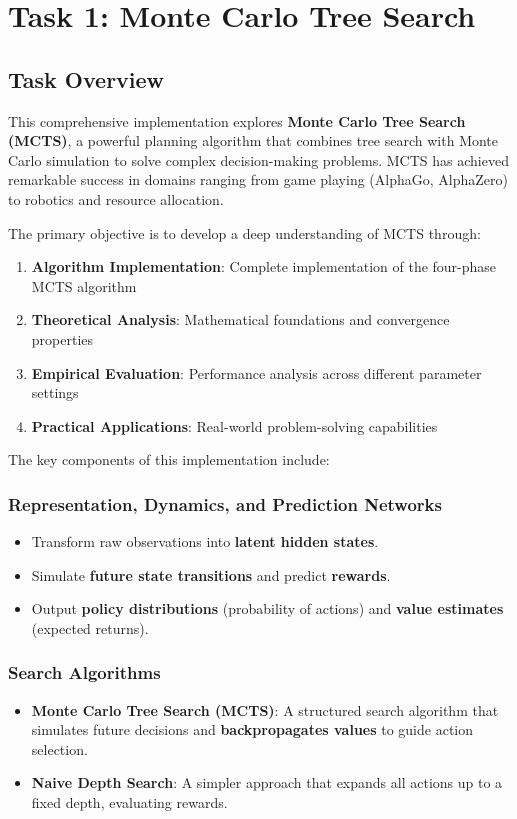 \section{Task 1: Monte Carlo Tree Search}

\subsection{Task Overview}
This comprehensive implementation explores \textbf{Monte Carlo Tree Search (MCTS)}, a powerful planning algorithm that combines tree search with Monte Carlo simulation to solve complex decision-making problems. MCTS has achieved remarkable success in domains ranging from game playing (AlphaGo, AlphaZero) to robotics and resource allocation.

The primary objective is to develop a deep understanding of MCTS through:
\begin{enumerate}
    \item \textbf{Algorithm Implementation}: Complete implementation of the four-phase MCTS algorithm
    \item \textbf{Theoretical Analysis}: Mathematical foundations and convergence properties
    \item \textbf{Empirical Evaluation}: Performance analysis across different parameter settings
    \item \textbf{Practical Applications}: Real-world problem-solving capabilities
\end{enumerate}

The key components of this implementation include:

\subsubsection{Representation, Dynamics, and Prediction Networks}
\begin{itemize}
    \item Transform raw observations into \textbf{latent hidden states}.
    \item Simulate \textbf{future state transitions} and predict \textbf{rewards}.
    \item Output \textbf{policy distributions} (probability of actions) and \textbf{value estimates} (expected returns).
\end{itemize}

\subsubsection{Search Algorithms}
\begin{itemize}
    \item \textbf{Monte Carlo Tree Search (MCTS)}: A structured search algorithm that simulates future decisions and \textbf{backpropagates values} to guide action selection.
    \item \textbf{Naive Depth Search}: A simpler approach that expands all actions up to a fixed depth, evaluating rewards.
\end{itemize}

